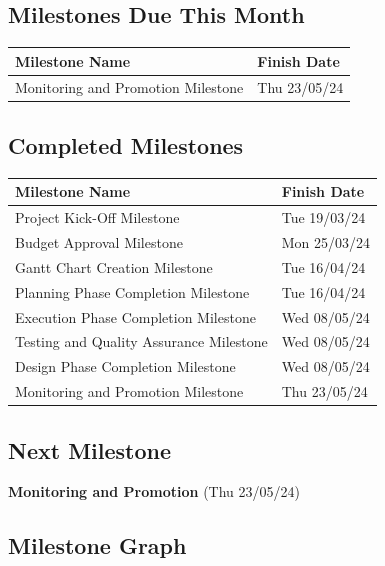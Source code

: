 \subsection*{Milestones Due This Month}
\begin{tabular}{|l|l|}
\hline
\rowcolor{lightblue} Milestone Name & Finish Date \\
\hline
Monitoring and Promotion Milestone & Thu 23/05/24 \\
\hline
\end{tabular}

\subsection*{Completed Milestones}
\begin{tabular}{|l|l|}
\hline
\rowcolor{lightgreen} Milestone Name & Finish Date \\
\hline
Project Kick-Off Milestone & Tue 19/03/24 \\
\hline
Budget Approval Milestone & Mon 25/03/24 \\
\hline
Gantt Chart Creation Milestone & Tue 16/04/24 \\
\hline
Planning Phase Completion Milestone & Tue 16/04/24 \\
\hline
Execution Phase Completion Milestone & Wed 08/05/24 \\
\hline
Testing and Quality Assurance Milestone & Wed 08/05/24 \\
\hline
Design Phase Completion Milestone & Wed 08/05/24 \\
\hline
Monitoring and Promotion Milestone & Thu 23/05/24 \\
\hline
\end{tabular}

\subsection*{Next Milestone}
\textbf{Monitoring and Promotion} (Thu 23/05/24)

\subsection*{Milestone Graph}

